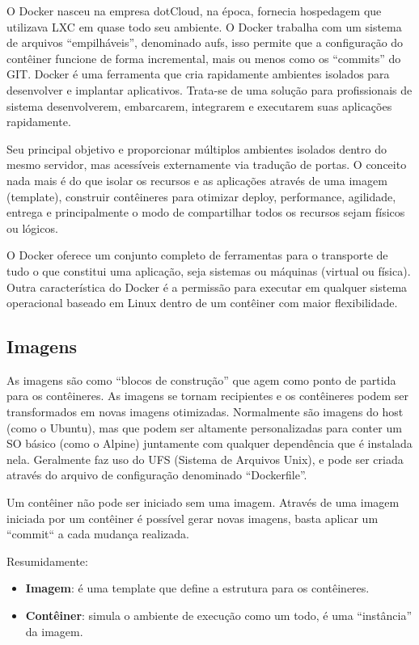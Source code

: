 \documentclass[a4paper,11pt]{article}
\begin{document}
O Docker nasceu na empresa dotCloud, na época, fornecia hospedagem que utilizava LXC em quase todo seu ambiente. O Docker trabalha com um sistema de arquivos ``empilháveis'', denominado aufs, isso permite que a configuração do contêiner funcione de forma incremental, mais ou menos como os ``commits'' do GIT. Docker é uma ferramenta que cria rapidamente ambientes isolados para desenvolver e implantar aplicativos. Trata-se de uma solução para profissionais de sistema desenvolverem, embarcarem, integrarem e executarem suas aplicações rapidamente.

Seu principal objetivo e proporcionar múltiplos ambientes isolados dentro do mesmo servidor, mas acessíveis externamente via tradução de portas. O conceito nada mais é do que isolar os recursos e as aplicações através de uma imagem (template), construir contêineres para otimizar deploy, performance, agilidade, entrega e principalmente o modo de compartilhar todos os recursos sejam físicos ou lógicos.

O Docker oferece um conjunto completo de ferramentas para o transporte de tudo o que constitui uma aplicação, seja sistemas ou máquinas (virtual ou física). Outra característica do Docker é a permissão para executar em qualquer sistema operacional baseado em Linux dentro de um contêiner com maior flexibilidade.

\subsection{Imagens}
As imagens são como ``blocos de construção'' que agem como ponto de partida para os contêineres. As imagens se tornam recipientes e os contêineres podem ser transformados em novas imagens otimizadas. Normalmente são imagens do host (como o Ubuntu), mas que podem ser altamente personalizadas para conter um SO básico (como o Alpine) juntamente com qualquer dependência que é instalada nela. Geralmente faz uso do UFS (Sistema de Arquivos Unix), e pode ser criada através do arquivo de configuração denominado ``Dockerfile''.

Um contêiner não pode ser iniciado sem uma imagem. Através de uma imagem 
iniciada por um contêiner é possível gerar novas imagens, basta aplicar um 
“commit“ a cada mudança realizada.

Resumidamente: \vspace{-1em}
\begin{itemize}
	\item \textbf{Imagem}: é uma template que define a estrutura para os contêineres.
	\item \textbf{Contêiner}: simula o ambiente de execução como um todo, é uma ``instância'' da imagem.
\end{itemize}
\end{document}

